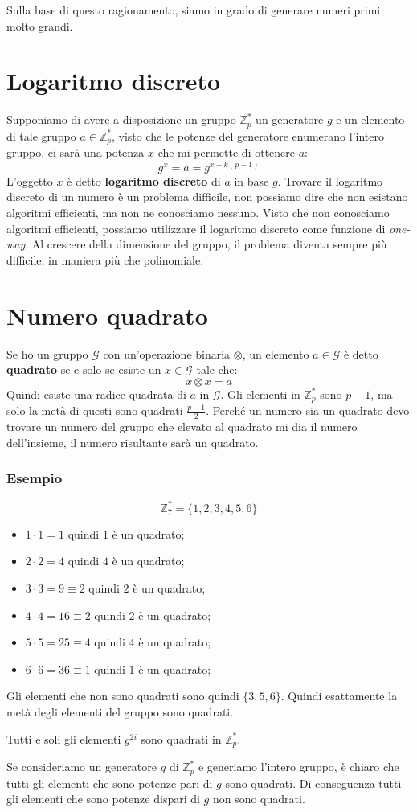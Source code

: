 Sulla base di questo ragionamento, siamo in grado di generare numeri primi molto grandi.
\section{Logaritmo discreto}
Supponiamo di avere a disposizione un gruppo $\mathbb{Z}_p^*$ un generatore $g$ e un 
elemento di tale gruppo $a \in \mathbb{Z}_p^*$, visto che le potenze del generatore enumerano 
l'intero gruppo, ci sarà una potenza $x$ che mi permette di ottenere $a$:
\[
  g^x = a = g^{x+k(p-1)}
\]
L'oggetto $x$ è detto \textbf{logaritmo discreto} di $a$ in base $g$.
Trovare il logaritmo discreto di un numero è un problema difficile, non possiamo dire che non esistano 
algoritmi efficienti, ma non ne conosciamo nessuno.
Visto che non conosciamo algoritmi efficienti, possiamo utilizzare il logaritmo discreto come
funzione di \textit{one-way}. Al crescere della dimensione del gruppo, il problema diventa
sempre più difficile, in maniera più che polinomiale.

\section{Numero quadrato}
Se ho un gruppo $\mathcal{G}$ con un'operazione binaria $\otimes$, un elemento $a \in \mathcal{G}$
è detto \textbf{quadrato} se e solo se esiste un $x \in \mathcal{G}$ tale che:
\[
  x \otimes x = a
\]
Quindi esiste una radice quadrata di $a$ in $\mathcal{G}$.
Gli elementi in $\mathbb{Z}_p^*$ sono $p-1$, ma solo la metà di questi sono quadrati $\frac{p-1}{2}$.
Perché un numero sia un quadrato devo trovare un numero del gruppo 
che elevato al quadrato mi dia il numero dell'insieme, il numero risultante sarà un quadrato.
\subsubsection{Esempio}
\[
  \mathbb{Z}_7^* = \{1,2,3,4,5,6\}
\]
\begin{itemize}
  \item $1 \cdot 1 = 1$ quindi $1$ è un quadrato;
  \item $2 \cdot 2 = 4$ quindi $4$ è un quadrato;
  \item $3 \cdot 3 = 9 \equiv 2$ quindi $2$ è un quadrato;
  \item $4 \cdot 4 = 16 \equiv 2$ quindi $2$ è un quadrato;
  \item $5 \cdot 5 = 25 \equiv 4$ quindi $4$ è un quadrato;
  \item $6 \cdot 6 = 36 \equiv 1$ quindi $1$ è un quadrato;
\end{itemize}
Gli elementi che non sono quadrati sono quindi $\{3,5,6\}$. Quindi esattamente la metà
degli elementi del gruppo sono quadrati. 
\begin{theorem}
  Tutti e soli gli elementi $g^{2i}$ sono quadrati in $\mathbb{Z}_p^*$.
\end{theorem}
Se consideriamo un generatore $g$ di $\mathbb{Z}_p^*$ e generiamo l'intero gruppo,
è chiaro che tutti gli elementi che sono potenze pari di $g$ sono quadrati.
Di conseguenza tutti gli elementi che sono potenze dispari di $g$ non sono quadrati.

